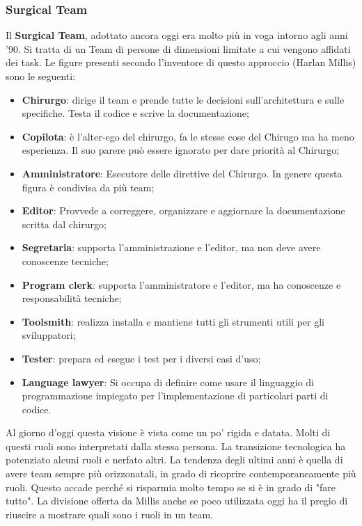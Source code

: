 \subsubsection{Surgical Team}
Il \textbf{Surgical Team}, adottato ancora oggi era molto più in voga intorno agli anni '90. Si tratta di un Team di persone di dimensioni limitate a cui vengono affidati dei task. Le figure presenti secondo l'inventore di questo approccio (Harlan Millis) sono le seguenti:
\begin{itemize}
	\item \textbf{Chirurgo}: dirige il team e prende tutte le decisioni sull'architettura e sulle specifiche. Testa il codice e scrive la documentazione;
	\item \textbf{Copilota}: è l'alter-ego del chirurgo, fa le stesse cose del Chirugo ma ha meno esperienza. Il suo parere può essere ignorato per dare priorità al Chirurgo;
	\item \textbf{Amministratore}: Esecutore delle direttive del Chirurgo. In genere questa figura è condivisa da più team;
	\item \textbf{Editor}: Provvede a correggere, organizzare e aggiornare la documentazione scritta dal chirurgo;
	\item \textbf{Segretaria}: supporta l'amministrazione e l'editor, ma non deve avere conoscenze tecniche;
	\item \textbf{Program clerk}: supporta l'amministratore e l'editor, ma ha conoscenze e responsabilità tecniche;
	\item \textbf{Toolsmith}: realizza installa e mantiene tutti gli strumenti utili per gli sviluppatori;
	\item \textbf{Tester}: prepara ed esegue i test per i diversi casi d'uso;
	\item \textbf{Language lawyer}: Si occupa di definire come usare il linguaggio di programmazione impiegato per l'implementazione di particolari parti di codice.
\end{itemize}
Al giorno d'oggi questa visione è vista come un po' rigida e datata. Molti di questi ruoli sono interpretati dalla stessa persona. La transizione tecnologica ha potenziato alcuni ruoli e nerfato altri. La tendenza degli ultimi anni è quella di avere team sempre più orizzonatali, in grado di ricoprire contemporaneamente più ruoli. Questo accade perché si risparmia molto tempo se si è in grado di "fare tutto". La divisione offerta da Millis anche se poco utilizzata oggi ha il pregio di riuscire a mostrare quali sono i ruoli in un team.

